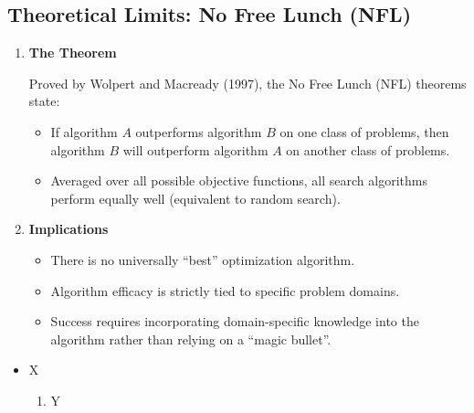 \documentclass[12pt]{article}
\begin{document}
\subsection{Theoretical Limits: No Free Lunch (NFL)}
\begin{enumerate}

    \begin{enumerate}
        \item \textbf{The Theorem}

              Proved by Wolpert and Macready (1997), the No Free Lunch (NFL) theorems state:
              \begin{itemize}
                  \item If algorithm $A$ outperforms algorithm $B$ on one class of problems, then algorithm $B$ will outperform algorithm $A$ on another class of problems.
                  \item Averaged over all possible objective functions, all search algorithms perform equally well (equivalent to random search).
              \end{itemize}

        \item \textbf{Implications}
              \begin{itemize}
                  \item There is no universally ``best'' optimization algorithm.
                  \item Algorithm efficacy is strictly tied to specific problem domains.
                  \item Success requires incorporating domain-specific knowledge into the algorithm rather than relying on a ``magic bullet''.
              \end{itemize}

    \end{enumerate}
\end{enumerate}

\begin{itemize}
    \item X
          \begin{enumerate}
              \item Y
          \end{enumerate}
\end{itemize}
\end{document}
